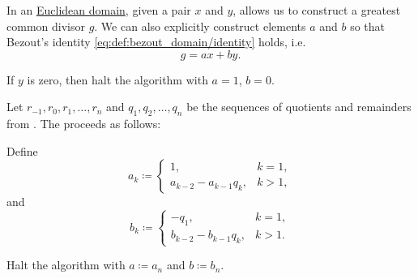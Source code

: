 \begin{algorithm}\label{alg:extended_euclidean_algorithm}
  In an \hyperref[def:euclidean_domain]{Euclidean domain}, given a pair \( x \) and \( y \),  allows us to construct a greatest common divisor \( g \). We can also explicitly construct elements \( a \) and \( b \) so that Bezout's identity \eqref{eq:def:bezout_domain/identity} holds, i.e.
  \begin{equation*}
    g = ax + by.
  \end{equation*}

  \begin{thmenum}
     If \( y \) is zero, then halt the algorithm with \( a = 1 \), \( b = 0 \).

     Let \( r_{-1}, r_0, r_1, \ldots, r_n \) and \( q_1, q_2, \ldots, q_n \) be the sequences of quotients and remainders from . The  proceeds as follows:

    Define
    \begin{equation*}
      a_k \coloneqq \begin{cases}
        1,                     &k = 1, \\
        a_{k-2} - a_{k-1} q_k, &k > 1,
      \end{cases}
    \end{equation*}
    and
    \begin{equation*}
      b_k \coloneqq \begin{cases}
        -q_1,                  &k = 1, \\
        b_{k-2} - b_{k-1} q_k, &k > 1.
      \end{cases}
    \end{equation*}

    Halt the algorithm with \( a \coloneqq a_n \) and \( b \coloneqq b_n \).
  \end{thmenum}
\end{algorithm}
